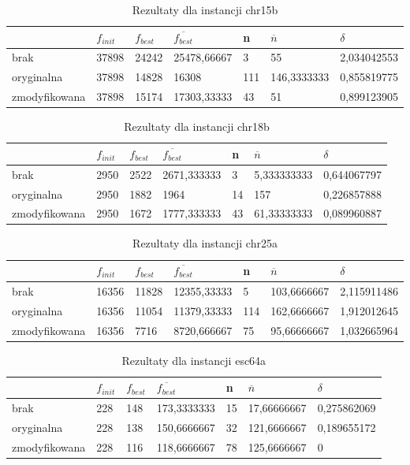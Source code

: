 \begin{table}[H]
\label{T1_chr15b}
\begin{tabular}{l l l l l l l}
\hline
 & $f_{init}$ & $f_{best}$ & $\overline{f_{best}}$ & n & $\overline{n}$ & $\delta$ \\
\hline
brak & 37898 & 24242 & 25478,66667 & 3 & 55 & 2,034042553\\
oryginalna & 37898 & 14828 & 16308 & 111 & 146,3333333 & 0,855819775\\
zmodyfikowana & 37898 & 15174 & 17303,33333 & 43 & 51 & 0,899123905\\
\hline
\end{tabular}
\caption{Rezultaty dla instancji chr15b}
\end{table}

\begin{table}[H]
\label{T1_chr18b}
\begin{tabular}{l l l l l l l}
\hline
 & $f_{init}$ & $f_{best}$ & $\overline{f_{best}}$ & n & $\overline{n}$ & $\delta$ \\
\hline
brak & 2950 & 2522 & 2671,333333 & 3 & 5,333333333 & 0,644067797\\
oryginalna & 2950 & 1882 & 1964 & 14 & 157 & 0,226857888\\
zmodyfikowana & 2950 & 1672 & 1777,333333 & 43 & 61,33333333 & 0,089960887\\
\hline
\end{tabular}
\caption{Rezultaty dla instancji chr18b}
\end{table}

\begin{table}[H]
\label{T1_chr25a}
\begin{tabular}{l l l l l l l}
\hline
 & $f_{init}$ & $f_{best}$ & $\overline{f_{best}}$ & n & $\overline{n}$ & $\delta$ \\
\hline
brak & 16356 & 11828 & 12355,33333 & 5 & 103,6666667 & 2,115911486\\
oryginalna & 16356 & 11054 & 11379,33333 & 114 & 162,6666667 & 1,912012645\\
zmodyfikowana & 16356 & 7716 & 8720,666667 & 75 & 95,66666667 & 1,032665964\\
\hline
\end{tabular}
\caption{Rezultaty dla instancji chr25a}
\end{table}

\begin{table}[H]
\label{T1_esc64a}
\begin{tabular}{l l l l l l l}
\hline
 & $f_{init}$ & $f_{best}$ & $\overline{f_{best}}$ & n & $\overline{n}$ & $\delta$ \\
\hline
brak & 228 & 148 & 173,3333333 & 15 & 17,66666667 & 0,275862069\\
oryginalna & 228 & 138 & 150,6666667 & 32 & 121,6666667 & 0,189655172\\
zmodyfikowana & 228 & 116 & 118,6666667 & 78 & 125,6666667 & 0\\
\hline
\end{tabular}
\caption{Rezultaty dla instancji esc64a}
\end{table}

